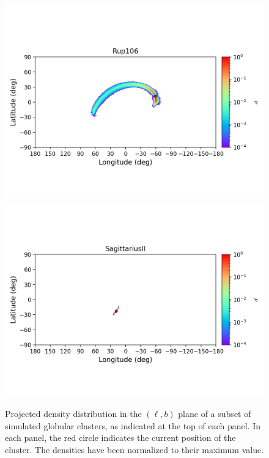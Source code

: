 \begin{figure}
\begin{center}
                \includegraphics[clip=true, trim = 0mm 20mm 0mm 10mm, width=1\columnwidth]{images/error_plots_Rup106.png}
                \includegraphics[clip=true, trim = 0mm 20mm 0mm 10mm, width=1\columnwidth]{images/error_plots_SagittariusII.png}
            \end{center}
            \caption[]{Projected density distribution in the $(\ell, b)$ plane of a subset of simulated globular clusters, as indicated at the top of each panel. In each panel, the red circle indicates the current position of the cluster. The densities have been normalized to their maximum value.}\label{stream18}
        \end{figure}

